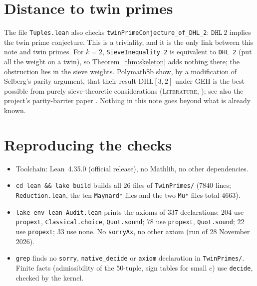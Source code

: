 \documentclass[11pt]{amsart}
\theoremstyle{definition}
\theoremstyle{remark}
\newcommand{\lbl}[1]{\textup{\textsc{#1}}}
\newcommand{\DHL}{\mathrm{DHL}}
\newcommand{\tl}[1]{\texttt{#1}}
\begin{document}
\section{Distance to twin primes}

The file \tl{Tuples.lean} also checks \tl{twinPrimeConjecture\_of\_DHL\_2}:
$\tl{DHL}\ 2$ implies the twin prime conjecture. This is a triviality, and it
is the only link between this note and twin primes. For $k=2$,
\tl{SieveInequality 2} is equivalent to \tl{DHL 2} (put all the weight on a
twin), so Theorem~\ref{thm:skeleton} adds nothing there; the obstruction lies in
the sieve weights. Polymath8b show, by a modification of Selberg's parity
argument, that their result $\DHL[3,2]$ under GEH is the best possible from
purely sieve-theoretic considerations (\lbl{Literature}, \cite[abstract]{Pol14b});
see also the project's parity-barrier paper \cite{Kim26p}. Nothing in this note goes beyond what is
already known.

\section{Reproducing the checks}\label{sec:audit}

\begin{itemize}
\item Toolchain: Lean~4.35.0 (official release), no Mathlib, no other dependencies.
\item \tl{cd lean \&\& lake build} builds all $26$ files of \tl{TwinPrimes/}
($7840$ lines; \tl{Reduction.lean}, the ten \tl{Maynard*} files and the two \tl{Mu*} files total $4663$).
\item \tl{lake env lean Audit.lean} prints the axioms of $337$ declarations: $204$
use \tl{propext}, \tl{Classical.choice}, \tl{Quot.sound}; $78$ use
\tl{propext}, \tl{Quot.sound}; $22$ use \tl{propext}; $33$ use none. No
\tl{sorryAx}, no other axiom (run of 28 November 2026).
\item \tl{grep} finds no \tl{sorry}, \tl{native\_decide} or \tl{axiom}
declaration in \tl{TwinPrimes/}. Finite facts (admissibility of the $50$-tuple,
sign tables for small $c$) use \tl{decide}, checked by the kernel.
\end{itemize}

\appendix
\end{document}

